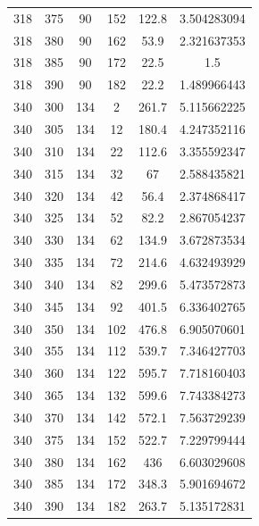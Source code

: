 \documentclass{article}
\begin{document}
\begin{table}[H]
{\begin{tabular}{cccccc}
    318 & 375 & 90 & 152 & 122.8 & 3.504283094 \\
    318 & 380 & 90 & 162 & 53.9 & 2.321637353 \\
    318 & 385 & 90 & 172 & 22.5 & 1.5 \\
    318 & 390 & 90 & 182 & 22.2 & 1.489966443 \\
    340 & 300 & 134 & 2 & 261.7 & 5.115662225 \\
    340 & 305 & 134 & 12 & 180.4 & 4.247352116 \\
    340 & 310 & 134 & 22 & 112.6 & 3.355592347 \\
    340 & 315 & 134 & 32 & 67 & 2.588435821 \\
    340 & 320 & 134 & 42 & 56.4 & 2.374868417 \\
    340 & 325 & 134 & 52 & 82.2 & 2.867054237 \\
    340 & 330 & 134 & 62 & 134.9 & 3.672873534 \\
    340 & 335 & 134 & 72 & 214.6 & 4.632493929 \\
    340 & 340 & 134 & 82 & 299.6 & 5.473572873 \\
    340 & 345 & 134 & 92 & 401.5 & 6.336402765 \\
    340 & 350 & 134 & 102 & 476.8 & 6.905070601 \\
    340 & 355 & 134 & 112 & 539.7 & 7.346427703 \\
    340 & 360 & 134 & 122 & 595.7 & 7.718160403 \\
    340 & 365 & 134 & 132 & 599.6 & 7.743384273 \\
    340 & 370 & 134 & 142 & 572.1 & 7.563729239 \\
    340 & 375 & 134 & 152 & 522.7 & 7.229799444 \\
    340 & 380 & 134 & 162 & 436 & 6.603029608 \\
    340 & 385 & 134 & 172 & 348.3 & 5.901694672 \\
    340 & 390 & 134 & 182 & 263.7 & 5.135172831
    \end{tabular}}
    \end{table}
\end{document}
